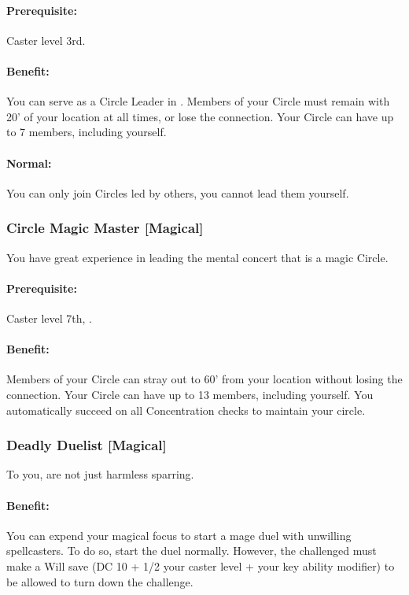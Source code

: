 \paragraph{Prerequisite:} Caster level 3rd.
\paragraph{Benefit:} You can serve as a Circle Leader in . Members of your Circle must remain with 20' of your location at all times, or lose the connection. Your Circle can have up to 7 members, including yourself.
\paragraph{Normal:} You can only join Circles led by others, you cannot lead them yourself.

\subsubsection[Circle Magic Master]{Circle Magic Master [Magical]}
\label{Feat:CircleMagicMaster}
You have great experience in leading the mental concert that is a magic Circle.
\paragraph{Prerequisite:} Caster level 7th, .
\paragraph{Benefit:} Members of your Circle can stray out to 60' from your location without losing the connection. Your Circle can have up to 13 members, including yourself. You automatically succeed on all Concentration checks to maintain your circle.

\subsubsection[Deadly Duelist]{Deadly Duelist [Magical]}
\label{Feat:DeadlyDuelist}
To you,  are not just harmless sparring.

\paragraph{Benefit:} You can expend your magical focus to start a mage duel with unwilling spellcasters. To do so, start the duel normally. However, the challenged must make a Will save (DC 10 + 1/2 your caster level + your key ability modifier) to be allowed to turn down the challenge.

